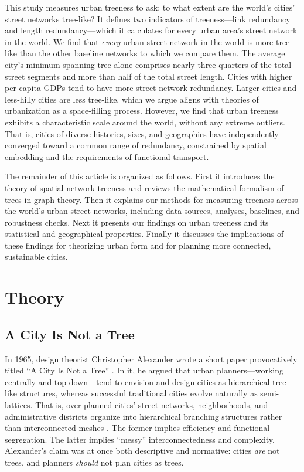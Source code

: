 \documentclass[12pt,letterpaper]{article} %
\begin{document}
This study measures urban treeness to ask: to what extent are the world's cities' street networks tree-like? It defines two indicators of treeness---link redundancy and length redundancy---which it calculates for every urban area's street network in the world. We find that \textit{every} urban street network in the world is more tree-like than the other baseline networks to which we compare them. The average city's minimum spanning tree alone comprises nearly three-quarters of the total street segments and more than half of the total street length. Cities with higher per-capita GDPs tend to have more street network redundancy. Larger cities and less-hilly cities are less tree-like, which we argue aligns with theories of urbanization as a space-filling process. However, we find that urban treeness exhibits a characteristic scale around the world, without any extreme outliers. That is, cities of diverse histories, sizes, and geographies have independently converged toward a common range of redundancy, constrained by spatial embedding and the requirements of functional transport.

The remainder of this article is organized as follows. First it introduces the theory of spatial network treeness and reviews the mathematical formalism of trees in graph theory. Then it explains our methods for measuring treeness across the world's urban street networks, including data sources, analyses, baselines, and robustness checks. Next it presents our findings on urban treeness and its statistical and geographical properties. Finally it discusses the implications of these findings for theorizing urban form and for planning more connected, sustainable cities.

\section{Theory}

\subsection{A City Is Not a Tree}

In 1965, design theorist Christopher Alexander wrote a short paper provocatively titled \enquote{A City Is Not a Tree} \citep{alexander_city_1965}. In it, he argued that urban planners---working centrally and top-down---tend to envision and design cities as hierarchical tree-like structures, whereas successful traditional cities evolve naturally as semi-lattices. That is, over-planned cities' street networks, neighborhoods, and administrative districts organize into hierarchical branching structures rather than interconnected meshes \citep{huang_city_2022}. The former implies efficiency and functional segregation. The latter implies \enquote{messy} interconnectedness and complexity. Alexander's claim was at once both descriptive and normative: cities \textit{are} not trees, and planners \textit{should} not plan cities as trees.
\end{document}
